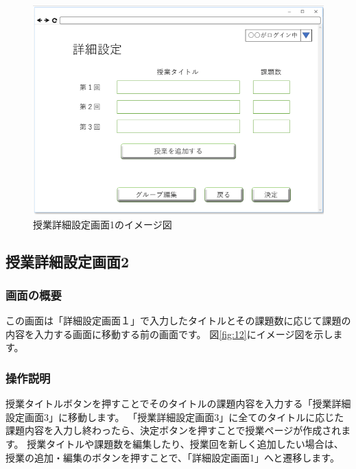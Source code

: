 \begin{figure}[htbp]
  \begin{center}
    \includegraphics[width=1\linewidth,clip]{./img/11.png}
    \caption{授業詳細設定画面1のイメージ図}\label{fig:11}
  \end{center}
\end{figure}

\newpage

\subsection{授業詳細設定画面2}
\subsubsection{画面の概要}
この画面は「詳細設定画面１」で入力したタイトルとその課題数に応じて課題の内容を入力する画面に移動する前の画面です。
図\ref{fig:12}にイメージ図を示します。

\subsubsection{操作説明}
授業タイトルボタンを押すことでそのタイトルの課題内容を入力する「授業詳細設定画面3」に移動します。
「授業詳細設定画面3」に全てのタイトルに応じた課題内容を入力し終わったら、決定ボタンを押すことで授業ページが作成されます。
授業タイトルや課題数を編集したり、授業回を新しく追加したい場合は、 %
授業の追加・編集のボタンを押すことで、「詳細設定画面1」へと遷移します。

